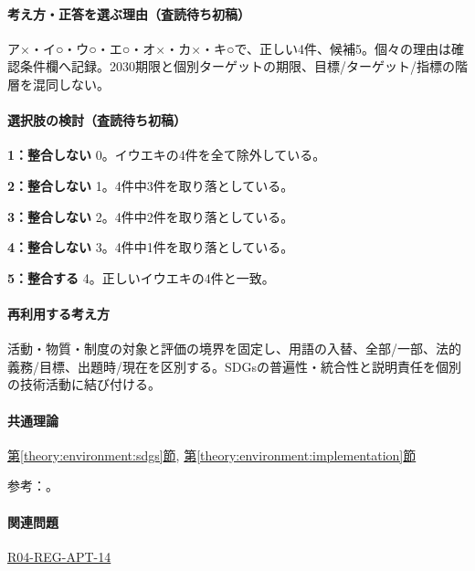 \paragraph{考え方・正答を選ぶ理由（査読待ち初稿）} ア×・イ○・ウ○・エ○・オ×・カ×・キ○で、正しい4件、候補5。個々の理由は確認条件欄へ記録。2030期限と個別ターゲットの期限、目標/ターゲット/指標の階層を混同しない。

\paragraph{選択肢の検討（査読待ち初稿）}\mbox{}\par

\noindent\textbf{1：整合しない} 0。イウエキの4件を全て除外している。\par

\noindent\textbf{2：整合しない} 1。4件中3件を取り落としている。\par

\noindent\textbf{3：整合しない} 2。4件中2件を取り落としている。\par

\noindent\textbf{4：整合しない} 3。4件中1件を取り落としている。\par

\noindent\textbf{5：整合する} 4。正しいイウエキの4件と一致。\par

\paragraph{再利用する考え方} 活動・物質・制度の対象と評価の境界を固定し、用語の入替、全部/一部、法的義務/目標、出題時/現在を区別する。SDGsの普遍性・統合性と説明責任を個別の技術活動に結び付ける。

\paragraph{共通理論} \hyperref[theory:environment:sdgs]{第\ref*{theory:environment:sdgs}節}, \hyperref[theory:environment:implementation]{第\ref*{theory:environment:implementation}節}

\par 参考：\cite{env_sdgs_agenda,env_sdgs2016,env_sdgs_un}。

\paragraph{関連問題} \hyperref[q:r04-reg-apt-14]{R04-REG-APT-14}

